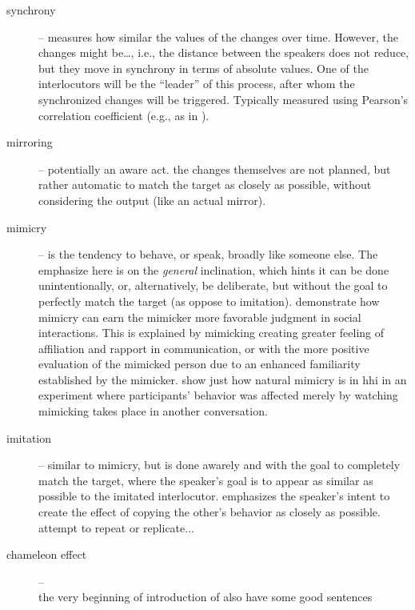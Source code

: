 \begin{description}
	\item[synchrony] -- measures how similar the values of the changes over time.
	However, the changes might be\ldots, i.e., the distance between the speakers does not reduce, but they move in synchrony in terms of absolute values.
	One of the interlocutors will be the ``leader'' of this process, after whom the synchronized changes will be triggered.
	Typically measured using Pearson's correlation coefficient (e.g., as in \citet{Edlund2009pause, Xia2014prosodic}).
	
	\item[mirroring] -- potentially an aware act.
	the changes themselves are not planned, but rather automatic to match the target as closely as possible, without considering the output (like an actual mirror).
	
	\item[mimicry] -- is the tendency to behave, or speak, broadly like someone else.
	The emphasize here is on the \emph{general} inclination, which hints it can be done unintentionally, or, alternatively, be deliberate, but without the goal to perfectly match the target (as oppose to imitation).
	\citet{Gueguen2009mimicry} demonstrate how mimicry can earn the mimicker more favorable judgment in social interactions.
	This is explained by mimicking creating greater feeling of affiliation and rapport in communication, or with the more positive evaluation of the mimicked person due to an enhanced familiarity established by the mimicker.
	\citet{Parrill2006seeing} show just how natural mimicry is in \ac{hhi} in an experiment where participants' behavior was affected merely by watching mimicking takes place in another conversation.
	
	\item[imitation] -- similar to mimicry, but is done awarely and with the goal to completely match the target, where the speaker's goal is to appear as similar as possible to the imitated interlocutor.
	emphasizes the speaker's intent to create the effect of copying the other's behavior as closely as possible.
	attempt to repeat or replicate...
	
	\item[chameleon effect] -- \citep{Chartrand1999chameleon}\\the very beginning of introduction of \citet{Gueguen2009mimicry} also have some good sentences
	

\end{description}

